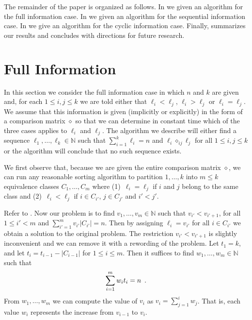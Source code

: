 \documentclass[11pt]{patmorin}
\newcommand{\N}{\mathbb{N}}
\newcommand{\op}{\diamond}
\newcommand{\opij}{\op_{ij}}
\begin{document}
The remainder of the paper is organized as follows.  In
 we given an algorithm for the full
information case.  In  we given an
algorithm for the sequential information case.  In
 we give an algorithm for the cyclic
information case. Finally,  summarizes our results
and concludes with directions for future research.

\section{Full Information}

In this section we consider the full information case in which $n$ and
$k$ are given and, for each $1\le i,j \le k$ we are told either that
$\ell_i< \ell_j$, $\ell_i > \ell_j$ or $\ell_i = \ell_j$.  We assume
that this information is given (implicitly or explicitly) in the form
of a comparison matrix $\op$ so that we can determine in constant time
which of the three cases applies to $\ell_i$ and $\ell_j$.  The
algorithm we describe will either find a sequence
$\ell_1,\ldots,\ell_k\in\N$ such that $\sum_{i=1}^k\ell_i = n$ and
$\ell_i\opij\ell_j$ for all $1\le i,j\le k$ or the algorithm will
conclude that no such sequence exists.

We first observe that, because we are given the entire comparison
matrix $\op$, we can run any reasonable sorting algorithm to partition
$1,\ldots,k$ into  $m\le k$ equivalence classes $C_1,\ldots,C_{m}$
where (1)~$\ell_i = \ell_j$ if $i$ and $j$ belong to the same class and
(2)~$\ell_i < \ell_j$ if $i\in C_{i'}$, $j\in C_{j'}$ and $i'< j'$.

Refer to .  Now our problem is to find
$v_1,\ldots,v_{m}\in\N$ such that $v_{i'} < v_{i'+1}$, for all $1\le
i' <
m$ and $\sum_{i'=1}^m{v_{i'}|C_{i'}|} = n$.  Then by assigning $\ell_i=v_{i'}$
for all $i\in C_{i'}$ we obtain a solution to the original problem.
The restriction $v_{i'} < v_{i'+1}$ is slightly inconvenient and we
can remove it with a rewording of the problem.  Let $t_1 = k$,
 and let $t_i=t_{i-1}-|C_{i-1}|$ for $1\le i\le m$.  Then
it suffices to find $w_1,\ldots,w_m\in\N$ such that
\begin{equation}
       \sum_{i=1}^m w_it_i = n \enspace . \eqlabel{wis}
\end{equation}
From $w_1,\ldots, w_m$ we can compute the value of $v_i$ as 
$v_i=\sum_{j=1}^i w_j$.  That is, each value $w_i$
represents the increase from $v_{i-1}$ to $v_i$.
\end{document}
